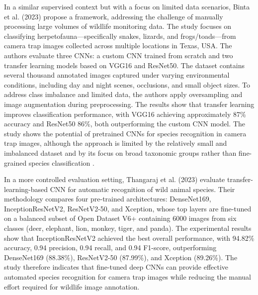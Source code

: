In a similar supervised context but with a focus on limited data scenarios, Binta et al. (2023) \citep{binta2023animal} propose a framework, addressing the challenge of manually processing large volumes of wildlife monitoring data. The study focuses on classifying herpetofauna—specifically snakes, lizards, and frogs/toads—from camera trap images collected across multiple locations in Texas, USA. The authors evaluate three CNNs: a custom CNN trained from scratch and two transfer learning models based on VGG16 and ResNet50. The dataset contains several thousand annotated images captured under varying environmental conditions, including day and night scenes, occlusions, and small object sizes. To address class imbalance and limited data, the authors apply oversampling and image augmentation during preprocessing. The results show that transfer learning improves classification performance, with VGG16 achieving approximately 87\% accuracy and ResNet50 86\%, both outperforming the custom CNN model. The study shows the potential of pretrained CNNs for species recognition in camera trap images, although the approach is limited by the relatively small and imbalanced dataset and by its focus on broad taxonomic groups rather than fine-grained species classification \citep{binta2023animal}.

In a more controlled evaluation setting, Thangaraj et al. (2023) \citep{thangaraj2023automated} evaluate transfer-learning-based CNN for automatic recognition of wild animal species. Their methodology compares four pre-trained architectures: DenseNet169, InceptionResNetV2, ResNetV2-50, and Xception, whose top layers are fine-tuned on a balanced subset of Open Dataset V6+ containing 6000 images from six classes (deer, elephant, lion, monkey, tiger, and panda). The experimental results show that InceptionResNetV2 achieved the best overall performance, with 94.82\% accuracy, 0.94 precision, 0.94 recall, and 0.94 F1-score, outperforming DenseNet169 (88.38\%), ResNetV2-50 (87.99\%), and Xception (89.26\%). The study therefore indicates that fine-tuned deep CNNs can provide effective automated species recognition for camera trap images while reducing the manual effort required for wildlife image annotation.

